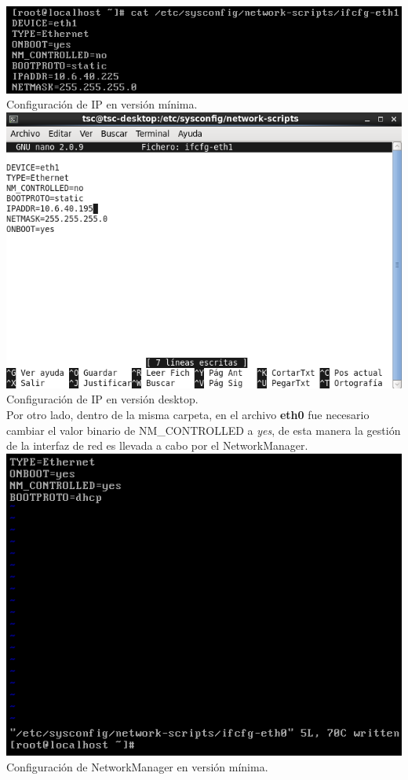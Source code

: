 \documentclass[11pt]{article}
\begin{document}
\includegraphics[width=.75\linewidth]{screenshots/minimal/cat-ifcfg-eth1.png}
    \\Configuración de IP en versión mínima.\\

\includegraphics[width=.75\linewidth]{screenshots/desktop/ifcfg-eth1.png}
    \\Configuración de IP en versión desktop.\\
    
Por otro lado, dentro de la misma carpeta, en el archivo \textbf{eth0} fue necesario cambiar el valor binario de NM\_CONTROLLED a \textit{yes}, de esta manera la gestión de la interfaz de red es llevada a cabo por el NetworkManager.\\

\includegraphics[width=.75\linewidth]{screenshots/minimal/ifcfg-eth0(after).png}
    \\Configuración de NetworkManager en versión mínima.\\
\end{document}
